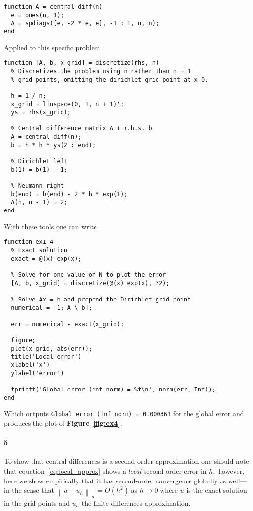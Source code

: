 \documentclass[a4paper]{article}
\newcommand{\norm}[1]{\left\lVert#1\right\rVert}
\begin{document}
  \begin{lstlisting}
function A = central_diff(n)
  e = ones(n, 1);
  A = spdiags([e, -2 * e, e], -1 : 1, n, n);
end
  \end{lstlisting}
  Applied to this specific problem
  \begin{lstlisting}
function [A, b, x_grid] = discretize(rhs, n)
  % Discretizes the problem using n rather than n + 1
  % grid points, omitting the dirichlet grid point at x_0.

  h = 1 / n;
  x_grid = linspace(0, 1, n + 1)';
  ys = rhs(x_grid);

  % Central difference matrix A + r.h.s. b
  A = central_diff(n);
  b = h * h * ys(2 : end);
  
  % Dirichlet left
  b(1) = b(1) - 1;

  % Neumann right
  b(end) = b(end) - 2 * h * exp(1);
  A(n, n - 1) = 2;
end
  \end{lstlisting}
  With these tools one can write
  \begin{lstlisting}
function ex1_4
  % Exact solution
  exact = @(x) exp(x);

  % Solve for one value of N to plot the error
  [A, b, x_grid] = discretize(@(x) exp(x), 32);
  
  % Solve Ax = b and prepend the Dirichlet grid point.
  numerical = [1; A \ b];

  err = numerical - exact(x_grid);

  figure;
  plot(x_grid, abs(err));
  title('Local error')
  xlabel('x')
  ylabel('error')

  fprintf('Global error (inf norm) = %f\n', norm(err, Inf));
end
  \end{lstlisting}
  Which outputs {\tt Global error (inf norm) = 0.000361} for the global error and produces the plot of {\bf Figure~\ref{fig:ex4}}.

  \paragraph{5} To show that central differences is a second-order approximation one should note that equation~\eqref{eq:local_approx} shows a \emph{local} second-order error in $h,$ however, here we show empirically that it has second-order convergence globally as well---in the sense that $\norm{u - u_h}_\infty = O(h^2)$ as $h \to 0$ where $u$ is the exact solution in the grid points and $u_h$ the finite differences approximation.
\end{document}
